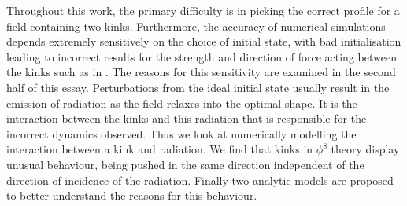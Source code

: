 \documentclass[11pt, oneside]{article}  	%
\numberwithin{equation}{section}
\begin{document}
Throughout this work, the primary difficulty is in picking the correct profile for a field containing two kinks. Furthermore, the accuracy of numerical simulations depends extremely sensitively on the choice of initial state, with bad initialisation leading to incorrect results for the strength and direction of force acting between the kinks such as in \cite{belendryasova}. The reasons for this sensitivity are examined in the second half of this essay. Perturbations from the ideal initial state usually result in the emission of radiation as the field relaxes into the optimal shape. It is the interaction between the kinks and this radiation that is responsible for the incorrect dynamics observed. Thus we look at numerically modelling the interaction between a kink and radiation. We find that kinks in $\phi^8$ theory display unusual behaviour, being pushed in the same direction independent of the direction of incidence of the radiation. Finally two analytic models are proposed to better understand the reasons for this behaviour.
\end{document}
